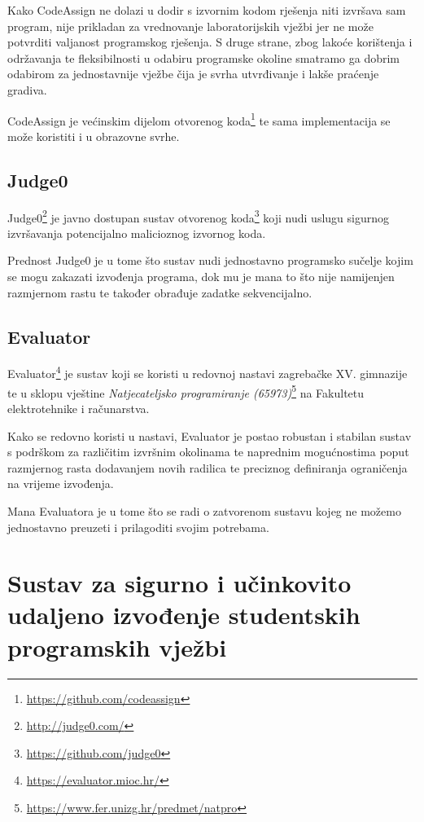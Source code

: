 \documentclass[times, utf8, zavrsni]{fer}
\begin{document}
Kako CodeAssign ne dolazi u dodir s izvornim kodom rješenja niti izvršava sam program, nije prikladan za vrednovanje laboratorijskih vježbi jer ne može potvrditi valjanost programskog rješenja. S druge strane, zbog lakoće korištenja i održavanja te fleksibilnosti u odabiru programske okoline smatramo ga dobrim odabirom za jednostavnije vježbe čija je svrha utvrđivanje i lakše praćenje gradiva.

CodeAssign je većinskim dijelom otvorenog koda{\footnote{\url{https://github.com/codeassign}}} te sama implementacija se može koristiti i u obrazovne svrhe.

\section{Judge0}

Judge0{\footnote{\url{http://judge0.com/}}} je javno dostupan sustav otvorenog koda{\footnote{\url{https://github.com/judge0}}} koji nudi uslugu sigurnog izvršavanja potencijalno malicioznog izvornog koda.

Prednost Judge0 je u tome što sustav nudi jednostavno programsko sučelje kojim se mogu zakazati izvođenja programa, dok mu je mana to što nije namijenjen razmjernom rastu te također obrađuje zadatke sekvencijalno. 

\section{Evaluator}

Evaluator{\footnote{\url{https://evaluator.mioc.hr/}}} je sustav koji se koristi u redovnoj nastavi zagrebačke XV. gimnazije te u sklopu vještine {\textit{Natjecateljsko programiranje (65973)}}{\footnote{\url{https://www.fer.unizg.hr/predmet/natpro}}} na Fakultetu elektrotehnike i računarstva.

Kako se redovno koristi u nastavi, Evaluator je postao robustan i stabilan sustav s podrškom za različitim izvršnim okolinama te naprednim mogućnostima poput razmjernog rasta dodavanjem novih radilica te preciznog definiranja ograničenja na vrijeme izvođenja.

Mana Evaluatora je u tome što se radi o zatvorenom sustavu kojeg ne možemo jednostavno preuzeti i prilagoditi svojim potrebama.

\chapter{Sustav za sigurno i učinkovito udaljeno izvođenje studentskih programskih vježbi}
\end{document}
